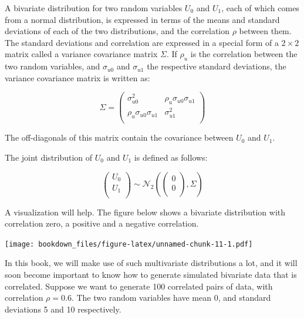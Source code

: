 \documentclass[12pt,]{krantz}
\begin{document}
A bivariate distribution for two random variables \(U_0\) and \(U_1\), each of which comes from a normal distribution, is expressed in terms of the means and standard deviations of each of the two distributions, and the correlation \(\rho\) between them. The standard deviations and correlation are expressed in a special form of a \(2\times 2\) matrix called a variance covariance matrix \(\Sigma\). If \(\rho_u\) is the correlation between the two random variables, and \(\sigma _{u0}\) and \(\sigma _{u1}\) the respective standard deviations, the variance covariance matrix is written as:

\begin{equation}\label{eq:covmatfoundations}
\Sigma
=
\begin{pmatrix}
\sigma _{u0}^2  & \rho _{u}\sigma _{u0}\sigma _{u1}\\
\rho _{u}\sigma _{u0}\sigma _{u1}    & \sigma _{u1}^2\\
\end{pmatrix}
\end{equation}

The off-diagonals of this matrix contain the covariance between \(U_0\) and \(U_1\).

The joint distribution of \(U_0\) and \(U_1\) is defined as follows:

\begin{equation}\label{eq:jointpriordistfoundations}
\begin{pmatrix}
  U_0 \\ 
  U_1 \\
\end{pmatrix}
\sim 
\mathcal{N}_2 \left(
\begin{pmatrix}
  0 \\
  0 \\
\end{pmatrix},
\Sigma
\right)
\end{equation}

A visualization will help. The figure below shows a bivariate distribution with correlation zero, a positive and a negative correlation.

\texttt{[image: bookdown\_files/figure-latex/unnamed-chunk-11-1.pdf]}

In this book, we will make use of such multivariate distributions a lot, and it will soon become important to know how to generate simulated bivariate data that is correlated. Suppose we want to generate 100 correlated pairs of data, with correlation \(\rho=0.6\). The two random variables have mean 0, and standard deviations 5 and 10 respectively.
\end{document}
